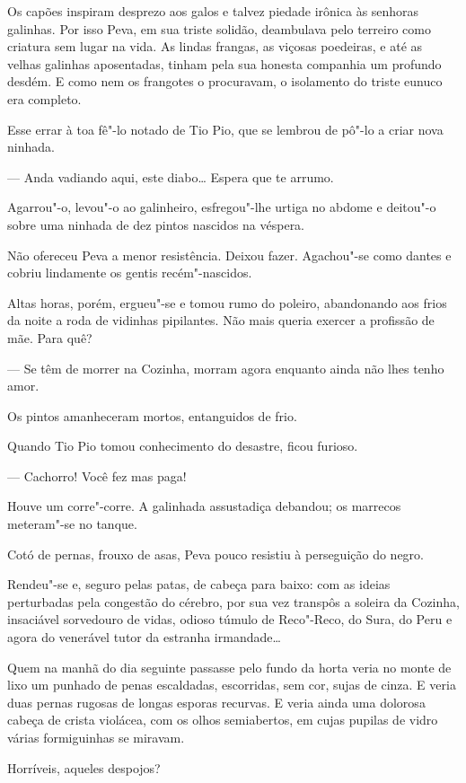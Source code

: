 Os capões inspiram desprezo aos galos e talvez piedade irônica às
senhoras galinhas. Por isso Peva, em sua triste solidão, deambulava pelo
terreiro como criatura sem lugar na vida. As lindas frangas, as viçosas
poedeiras, e até as velhas galinhas aposentadas, tinham pela sua honesta
companhia um profundo desdém. E como nem os frangotes o procuravam, o
isolamento do triste eunuco era completo.

Esse errar à toa fê"-lo notado de Tio Pio, que se lembrou de pô"-lo a
criar nova ninhada.

--- Anda vadiando aqui, este diabo\ldots{} Espera que te arrumo.

Agarrou"-o, levou"-o ao galinheiro, esfregou"-lhe urtiga no abdome e
deitou"-o sobre uma ninhada de dez pintos nascidos na véspera.

Não ofereceu Peva a menor resistência. Deixou fazer. Agachou"-se como
dantes e cobriu lindamente os gentis recém"-nascidos.

Altas horas, porém, ergueu"-se e tomou rumo do poleiro, abandonando aos
frios da noite a roda de vidinhas pipilantes. Não mais queria exercer a
profissão de mãe. Para quê?

--- Se têm de morrer na Cozinha, morram agora enquanto ainda não lhes
tenho amor.

Os pintos amanheceram mortos, entanguidos de frio.

Quando Tio Pio tomou conhecimento do desastre, ficou furioso.

--- Cachorro! Você fez mas paga!

Houve um corre"-corre. A galinhada assustadiça debandou; os marrecos
meteram"-se no tanque.

Cotó de pernas, frouxo de asas, Peva pouco resistiu à perseguição do
negro.

Rendeu"-se e, seguro pelas patas, de cabeça para baixo: com as ideias
perturbadas pela congestão do cérebro, por sua vez transpôs a soleira da
Cozinha, insaciável sorvedouro de vidas, odioso túmulo de Reco"-Reco, do
Sura, do Peru e agora do venerável tutor da estranha irmandade\ldots{}

Quem na manhã do dia seguinte passasse pelo fundo da horta veria no
monte de lixo um punhado de penas escaldadas, escorridas, sem cor, sujas
de cinza. E veria duas pernas rugosas de longas esporas recurvas. E
veria ainda uma dolorosa cabeça de crista violácea, com os olhos
semiabertos, em cujas pupilas de vidro várias formiguinhas se miravam.

Horríveis, aqueles despojos?

